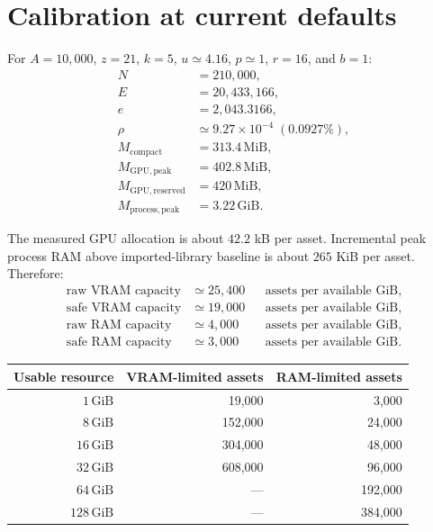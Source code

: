 \documentclass[10pt,a4paper]{article}
\newcommand{\GiB}{\,\mathrm{GiB}}
\newcommand{\MiB}{\,\mathrm{MiB}}
\begin{document}
\section*{Calibration at current defaults}

For $A=10{,}000$, $z=21$, $k=5$, $u\simeq4.16$, $p\simeq1$,
$r=16$, and $b=1$:
\begin{align}
  N &= 210{,}000, \\
  E &= 20{,}433{,}166, \\
  e &= 2{,}043.3166, \\
  \rho &\simeq 9.27\times10^{-4}\;(0.0927\%), \\
  M_{\mathrm{compact}} &= 313.4\MiB, \\
  M_{\mathrm{GPU,peak}} &= 402.8\MiB, \\
  M_{\mathrm{GPU,reserved}} &= 420\MiB, \\
  M_{\mathrm{process,peak}} &= 3.22\GiB.
\end{align}

The measured GPU allocation is about $42.2$ kB per asset.  Incremental peak
process RAM above imported-library baseline is about $265$ KiB per asset.
Therefore:
\begin{align}
  \text{raw VRAM capacity} &\simeq 25{,}400
       &&\text{assets per available GiB}, \\
  \text{safe VRAM capacity} &\simeq 19{,}000
       &&\text{assets per available GiB}, \\
  \text{raw RAM capacity} &\simeq 4{,}000
       &&\text{assets per available GiB}, \\
  \text{safe RAM capacity} &\simeq 3{,}000
       &&\text{assets per available GiB}.
\end{align}

\begin{center}
\begin{tabular}{@{}r rr@{}}
\toprule
Usable resource & VRAM-limited assets & RAM-limited assets \\
\midrule
$1\GiB$   & 19,000  & 3,000 \\
$8\GiB$   & 152,000 & 24,000 \\
$16\GiB$  & 304,000 & 48,000 \\
$32\GiB$  & 608,000 & 96,000 \\
$64\GiB$  & ---     & 192,000 \\
$128\GiB$ & ---     & 384,000 \\
\bottomrule
\end{tabular}
\end{center}
\end{document}
